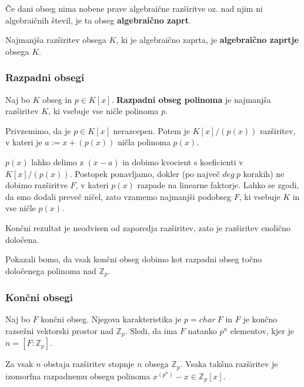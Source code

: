 \documentclass[11pt, a4paper]{article}
\begin{document}
    \begin{definition}
        Če dani obseg nima nobene prave algebraične razširitve oz. nad njim ni algebraičnih števil, je ta obseg \textbf{algebraično zaprt}.
    \end{definition}

    \begin{definition}
        Najmanjša razširitev obsega \(K\), ki je algebraično zaprta, je \textbf{algebraično zaprtje} obsega \(K\).
    \end{definition}
    
    \subsubsection{Razpadni obsegi}

    \begin{definition}
        Naj bo \(K\) obseg in \(p \in K[x]\). \textbf{Razpadni obseg polinoma} je najmanjša razširitev \(K\), ki vsebuje vse ničle polinoma \(p\).
    \end{definition}

    Privzemimo, da je \(p \in K[x]\) nerazcepen. Potem je \(K[x] / (p(x))\) razširitev, v kateri je \(a := x + (p(x))\) ničla polinoma \(p(x)\).
    \par
    \(p(x)\) lahko delimo z \((x-a)\) in dobimo kvocient s koeficienti v \(K[x] / (p(x))\). Postopek ponavljamo, dokler (po največ \(deg\ p\) korakih) ne dobimo razširitve \(F\), v kateri \(p(x)\) razpade na linearne faktorje. Lahko se zgodi, da smo dodali preveč ničel, zato vzamemo najmanjši podobseg \(F\), ki vsebuje \(K\) in vse ničle \(p(x)\).
    
    Končni rezultat je neodvisen od zaporedja razširitev, zato je razširitev enolično določena.
    \par
    Pokazali bomo, da vsak končni obseg dobimo kot razpadni obseg točno določenega polinoma nad \(\mathbb{Z}_p\).

    \subsubsection{Končni obsegi}

    Naj bo \(F\) končni obseg. Njegova karakteristika je \(p = char\ F\) in \(F\) je končno razsežni vektorski prostor nad \(\mathbb{Z}_p\). Sledi, da ima \(F\) natanko \(p^n\) elementov, kjer je \(n = [F:\mathbb{Z}_p]\).

    \begin{theorem}
        Za vsak \(n\) obstaja razširitev stopnje \(n\) obsega \(\mathbb{Z}_p\). Vsaka takšna razširitev je izomorfna razpadnemu obsegu polinoma \(x^{(p^n)} - x \in \mathbb{Z}_p[x]\).
    \end{theorem}
\end{document}
